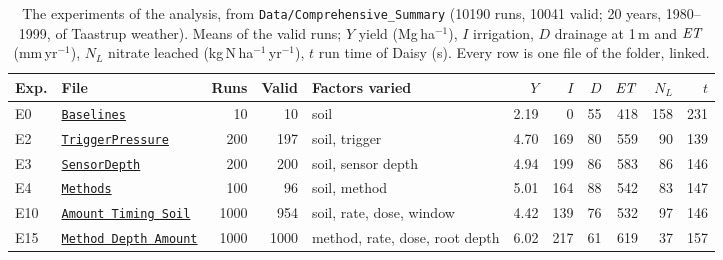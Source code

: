 \begin{table}[H]\centering\scriptsize
\caption{The experiments of the analysis, from \texttt{Data/Comprehensive\_Summary} (10190 runs, 10041 valid; 20 years, 1980--1999, of Taastrup weather). Means of the valid runs; $Y$ yield (Mg\,ha$^{-1}$), $I$ irrigation, $D$ drainage at 1\,m and $\mathit{ET}$ (mm\,yr$^{-1}$), $N_L$ nitrate leached (kg\,N\,ha$^{-1}$\,yr$^{-1}$), $t$ run time of Daisy (s). Every row is one file of the folder, linked.}
\label{tab:data4}
\setlength{\tabcolsep}{3pt}
\begin{tabular}{@{}llrrp{3.5cm}rrrrrr@{}}
\toprule
Exp. & File & Runs & Valid & Factors varied & $Y$ & $I$ & $D$ & $\mathit{ET}$ & $N_L$ & $t$\\\midrule
E0 & \href{\repourl/blob/main/Data/Comprehensive_Summary/E00_Baselines.csv.gz}{\texttt{Baselines}} & 10 & 10 & soil & 2.19 & 0 & 55 & 418 & 158 & 231\\
E2 & \href{\repourl/blob/main/Data/Comprehensive_Summary/E02_TriggerPressure.csv.gz}{\texttt{TriggerPressure}} & 200 & 197 & soil, trigger & 4.70 & 169 & 80 & 559 & 90 & 139\\
E3 & \href{\repourl/blob/main/Data/Comprehensive_Summary/E03_SensorDepth.csv.gz}{\texttt{SensorDepth}} & 200 & 200 & soil, sensor depth & 4.94 & 199 & 86 & 583 & 86 & 146\\
E4 & \href{\repourl/blob/main/Data/Comprehensive_Summary/E04_Methods.csv.gz}{\texttt{Methods}} & 100 & 96 & soil, method & 5.01 & 164 & 88 & 542 & 83 & 147\\
E10 & \href{\repourl/blob/main/Data/Comprehensive_Summary/E10_Amount_Timing_Soil.csv.gz}{\texttt{Amount Timing Soil}} & 1000 & 954 & soil, rate, dose, window & 4.42 & 139 & 76 & 532 & 97 & 146\\
E15 & \href{\repourl/blob/main/Data/Comprehensive_Summary/E15_Method_Depth_Amount.csv.gz}{\texttt{Method Depth Amount}} & 1000 & 1000 & method, rate, dose, root depth & 6.02 & 217 & 61 & 619 & 37 & 157\\
\bottomrule
\end{tabular}
\end{table}
